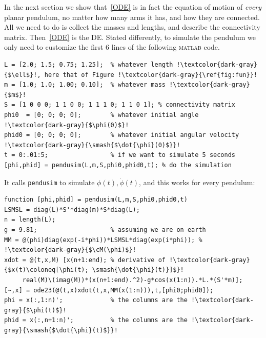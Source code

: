 \documentclass[12pt]{article}
\newcommand{\cM}{\mathcal{M}}
\def\lstbasicfont{\fontfamily{fvm}\selectfont} %
\newcommand{\mcode}[1]{\lstinline[basicstyle=\lstbasicfont,columns=fixed,basewidth=0.6em]!#1!}
\theoremstyle{sfdefinition}%
\theoremstyle{sfdefinition}
\DeclareMathOperator{\coloneq}{\,\raisebox{.08ex}{\ensuremath{:}}\!\!=}
\begin{document}
In the next section we show that~\eqref{ODE} is in fact the equation
of motion of \emph{every} planar pendulum, no matter how many arms it
has, and how they are connected.  All we need to do is collect the
masses and lengths, and describe the connectivity
matrix. Then~\eqref{ODE} is the DE. Stated differently, to simulate
the pendulum we only need to customize the first 6 lines of the
following \textsc{matlab} code.
\begin{lstlisting}
L = [2.0; 1.5; 0.75; 1.25];  % whatever length !\textcolor{dark-gray}{$\ell$}!, here that of Figure !\textcolor{dark-gray}{\ref{fig:fun}}! 
m = [1.0; 1.0; 1.00; 0.10];  % whatever mass !\textcolor{dark-gray}{$m$}! 
S = [1 0 0 0; 1 1 0 0; 1 1 1 0; 1 1 0 1]; % connectivity matrix 
phi0  = [0; 0; 0; 0];        % whatever initial angle !\textcolor{dark-gray}{$\phi(0)$}! 
phid0 = [0; 0; 0; 0];        % whatever initial angular velocity !\textcolor{dark-gray}{\smash{$\dot{\phi}(0)$}}! 
t = 0:.01:5;                 % if we want to simulate 5 seconds 
[phi,phid] = pendusim(L,m,S,phi0,phid0,t); % do the simulation 
\end{lstlisting}
It calls \mcode{pendusim} to simulate $\phi(t),\dot{\phi}(t)$, and
this works for every pendulum:
\begin{lstlisting}
function [phi,phid] = pendusim(L,m,S,phi0,phid0,t) 
LSMSL = diag(L)*S'*diag(m)*S*diag(L); 
n = length(L); 
g = 9.81;                    % assuming we are on earth                  
MM = @(phi)diag(exp(-i*phi))*LSMSL*diag(exp(i*phi)); % !\textcolor{dark-gray}{$\cM(\phi)$}! 
xdot = @(t,x,M) [x(n+1:end); % derivative of !\textcolor{dark-gray}{$x(t)\coloneq[\phi(t); \smash{\dot{\phi}(t)}]$}! 
     real(M)\(imag(M))*(x(n+1:end).^2)-g*cos(x(1:n)).*L.*(S'*m)]; 
[~,x] = ode23(@(t,x)xdot(t,x,MM(x(1:n))),t,[phi0;phid0]); 
phi = x(:,1:n)';             % the columns are the !\textcolor{dark-gray}{$\phi(t)$}! 
phid = x(:,n+1:n)';          % the columns are the !\textcolor{dark-gray}{\smash{$\dot{\phi}(t)$}}! 
\end{lstlisting}

\end{document}
